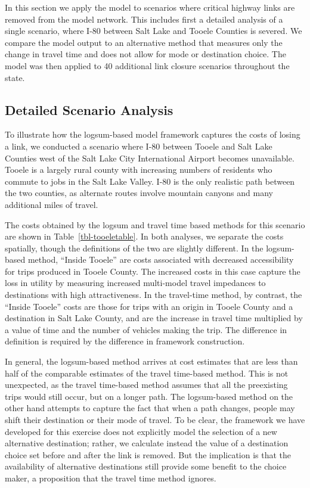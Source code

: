 \documentclass[
  letterpaper,
  number,
  review,
  3p]{elsarticle}
\begin{document}
In this section we apply the model to scenarios where critical highway
links are removed from the model network. This includes first a detailed
analysis of a single scenario, where I-80 between Salt Lake and Tooele
Counties is severed. We compare the model output to an alternative
method that measures only the change in travel time and does not allow
for mode or destination choice. The model was then applied to 40
additional link closure scenarios throughout the state.

\hypertarget{detailed-scenario-analysis}{%
\subsection{Detailed Scenario
Analysis}\label{detailed-scenario-analysis}}

To illustrate how the logsum-based model framework captures the costs of
losing a link, we conducted a scenario where I-80 between Tooele and
Salt Lake Counties west of the Salt Lake City International Airport
becomes unavailable. Tooele is a largely rural county with increasing
numbers of residents who commute to jobs in the Salt Lake Valley. I-80
is the only realistic path between the two counties, as alternate routes
involve mountain canyons and many additional miles of travel.

The costs obtained by the logsum and travel time based methods for this
scenario are shown in Table~\ref{tbl-tooeletable}. In both analyses, we
separate the costs spatially, though the definitions of the two are
slightly different. In the logsum-based method, ``Inside Tooele'' are
costs associated with decreased accessibility for trips produced in
Tooele County. The increased costs in this case capture the loss in
utility by measuring increased multi-model travel impedances to
destinations with high attractiveness. In the travel-time method, by
contrast, the ``Inside Tooele'' costs are those for trips with an origin
in Tooele County and a destination in Salt Lake County, and are the
increase in travel time multiplied by a value of time and the number of
vehicles making the trip. The difference in definition is required by
the difference in framework construction.

In general, the logsum-based method arrives at cost estimates that are
less than half of the comparable estimates of the travel time-based
method. This is not unexpected, as the travel time-based method assumes
that all the preexisting trips would still occur, but on a longer path.
The logsum-based method on the other hand attempts to capture the fact
that when a path changes, people may shift their destination or their
mode of travel. To be clear, the framework we have developed for this
exercise does not explicitly model the selection of a new alternative
destination; rather, we calculate instead the value of a destination
choice set before and after the link is removed. But the implication is
that the availability of alternative destinations still provide some
benefit to the choice maker, a proposition that the travel time method
ignores.
\end{document}
